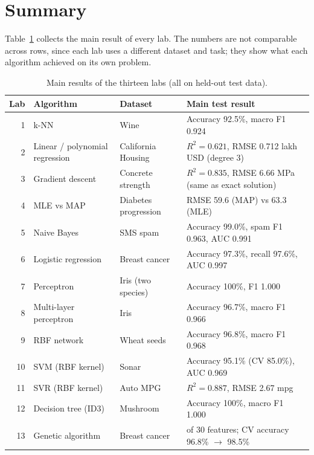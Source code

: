 \chapter*{Summary}

Table~\ref{tab:summary} collects the main result of every lab. The numbers are not comparable across
rows, since each lab uses a different dataset and task; they show what each algorithm achieved on its
own problem.

\begin{table}[H]
\centering\small
\caption{Main results of the thirteen labs (all on held-out test data).}
\label{tab:summary}
\begin{tabularx}{\linewidth}{@{}r l >{\raggedright\arraybackslash}X >{\raggedright\arraybackslash}X@{}}
\toprule
\textbf{Lab} & \textbf{Algorithm} & \textbf{Dataset} & \textbf{Main test result}\\
\midrule
1  & k-NN                   & Wine                 & Accuracy 92.5\%, macro F1 0.924\\
2  & Linear / polynomial regression & California Housing & $R^2=0.621$, RMSE 0.712 lakh USD (degree 3)\\
3  & Gradient descent       & Concrete strength    & $R^2=0.835$, RMSE 6.66 MPa (same as exact solution)\\
4  & MLE vs MAP             & Diabetes progression & RMSE 59.6 (MAP) vs 63.3 (MLE)\\
5  & Naive Bayes            & SMS spam             & Accuracy 99.0\%, spam F1 0.963, AUC 0.991\\
6  & Logistic regression    & Breast cancer        & Accuracy 97.3\%, recall 97.6\%, AUC 0.997\\
7  & Perceptron             & Iris (two species)   & Accuracy 100\%, F1 1.000\\
8  & Multi-layer perceptron & Iris                 & Accuracy 96.7\%, macro F1 0.966\\
9  & RBF network            & Wheat seeds          & Accuracy 96.8\%, macro F1 0.968\\
10 & SVM (RBF kernel)       & Sonar                & Accuracy 95.1\% (CV 85.0\%), AUC 0.969\\
11 & SVR (RBF kernel)       & Auto MPG             & $R^2=0.887$, RMSE 2.67 mpg\\
12 & Decision tree (ID3)    & Mushroom             & Accuracy 100\%, macro F1 1.000\\
13 & Genetic algorithm      & Breast cancer        & 12 of 30 features; CV accuracy 96.8\% $\to$ 98.5\%\\
\bottomrule
\end{tabularx}
\end{table}

